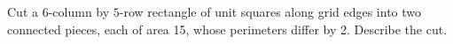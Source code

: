 Cut a $6$-column by $5$-row rectangle of unit squares along grid edges into two connected pieces, each of area 15, whose perimeters differ by 2. Describe the cut.
